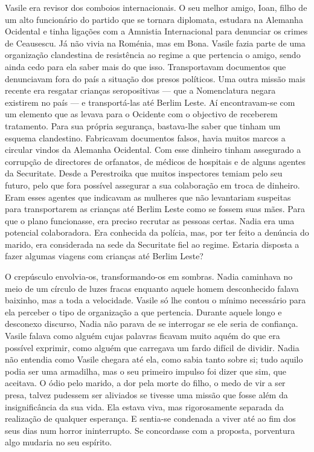 Vasile era revisor dos comboios internacionais. O seu melhor amigo,
Ioan, filho de um alto funcionário do partido que se tornara
diplomata, estudara na Alemanha Ocidental e tinha ligações com a
Amnistia Internacional para denunciar os crimes de Ceausescu. Já não
vivia na Roménia, mas em Bona. Vasile fazia parte de uma organização
clandestina de resistência ao regime a que pertencia o amigo, sendo
ainda cedo para ela saber mais do que isso. Transportavam documentos que
denunciavam fora do país a situação dos presos políticos. Uma outra
missão mais recente era resgatar crianças seropositivas --- que a
Nomenclatura negara existirem no país --- e transportá-las até Berlim
Leste. Aí encontravam-se com um elemento que as levava para o Ocidente
com o objectivo de receberem tratamento. Para sua própria segurança,
bastava-lhe saber que tinham um esquema clandestino. Fabricavam documentos falsos, havia muitos marcos a circular vindos da Alemanha
Ocidental. Com esse dinheiro tinham assegurado a corrupção de
directores de orfanatos, de médicos de hospitais e de alguns agentes da
Securitate. Desde a Perestroika que muitos inspectores temiam pelo seu
futuro,
pelo que fora possível assegurar a sua colaboração em troca de dinheiro.
Eram esses agentes que indicavam as mulheres que não levantariam
suspeitas para transportarem as crianças até Berlim Leste como se
fossem suas mães. Para que o plano funcionasse, era preciso recrutar as
pessoas certas. Nadia era uma potencial colaboradora. Era conhecida da
polícia, mas, por ter feito a denúncia do marido, era considerada na
sede da Securitate fiel ao regime. Estaria disposta a fazer algumas
viagens com crianças até Berlim Leste?

O crepúsculo envolvia-os, transformando-os em sombras. Nadia caminhava
no meio de um círculo de luzes fracas enquanto aquele homem desconhecido
falava baixinho, mas a toda a velocidade. Vasile só lhe contou o mínimo
necessário para ela perceber o tipo de organização a que pertencia.
Durante aquele longo e desconexo discurso, Nadia não parava de se
interrogar se ele seria de confiança. Vasile falava como alguém cujas
palavras ficavam muito aquém do que era possível exprimir, como alguém
que carregava um fardo difícil de dividir. Nadia não entendia como
Vasile chegara até ela, como sabia tanto sobre si; tudo aquilo podia ser
uma armadilha, mas o seu primeiro impulso foi dizer que sim, que
aceitava. O ódio pelo marido, a dor pela morte do filho, o medo de vir a
ser presa, talvez pudessem ser aliviados se tivesse uma missão que fosse
além da insignificância da sua vida. Ela estava viva, mas rigorosamente
separada da realização de qualquer esperança. E sentia-se condenada a
viver até ao fim dos seus dias num horror ininterrupto. Se concordasse
com a proposta, porventura algo mudaria no seu espírito.


